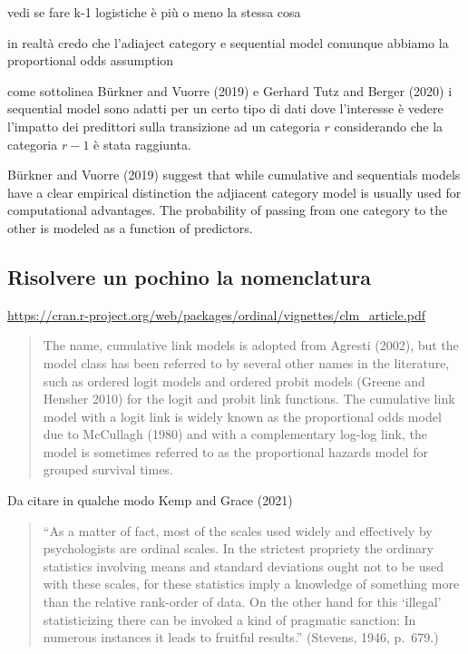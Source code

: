 \documentclass[
  man,floatsintext]{apa6}
\begin{document}
vedi se fare k-1 logistiche è più o meno la stessa cosa

in realtà credo che l'adiaject category e sequential model comunque abbiamo la proportional odds assumption

come sottolinea Bürkner and Vuorre (2019) e Gerhard Tutz and Berger (2020) i sequential model sono adatti per un certo tipo di dati dove l'interesse è vedere l'impatto dei predittori sulla transizione ad un categoria \(r\) considerando che la categoria \(r - 1\) è stata raggiunta.

Bürkner and Vuorre (2019) suggest that while cumulative and sequentials models have a clear empirical distinction the adjiacent category model is usually used for computational advantages. The probability of passing from one category to the other is modeled as a function of predictors.

\subsection{Risolvere un pochino la nomenclatura}\label{risolvere-un-pochino-la-nomenclatura}

\url{https://cran.r-project.org/web/packages/ordinal/vignettes/clm_article.pdf}

\begin{quote}
The name, cumulative link models is adopted from Agresti (2002), but the model class has
been referred to by several other names in the literature, such as ordered logit models and
ordered probit models (Greene and Hensher 2010) for the logit and probit link functions. The
cumulative link model with a logit link is widely known as the proportional odds model due
to McCullagh (1980) and with a complementary log-log link, the model is sometimes referred
to as the proportional hazards model for grouped survival times.
\end{quote}

Da citare in qualche modo Kemp and Grace (2021)

\begin{quote}
``As a matter of fact, most of the scales used widely and effectively by psychologists are ordinal scales. In the strictest propriety the ordinary statistics involving means and standard deviations ought not to be used with these scales, for these statistics imply a knowledge of something more than the relative rank-order of data. On the other hand for this `illegal' statisticizing there can be invoked a kind of pragmatic sanction: In numerous instances it leads to fruitful results.'' (Stevens, 1946, p.~679.)
\end{quote}
\end{document}
